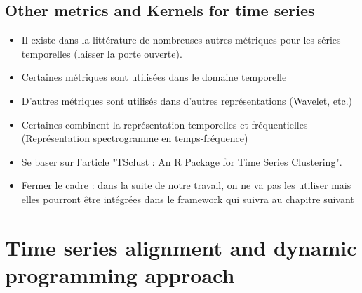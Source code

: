 

\subsection{Other metrics and Kernels for time series}
\begin{itemize}
	\item Il existe dans la littérature de nombreuses autres métriques pour les séries temporelles (laisser la porte ouverte).
	\item Certaines métriques sont utilisées dans le domaine temporelle
	\item D'autres métriques sont utilisés dans d'autres représentations (Wavelet, etc.)
	\item Certaines combinent la représentation temporelles et fréquentielles (Représentation spectrogramme en temps-fréquence)
	\item Se baser sur l'article "TSclust : An R Package for Time Series Clustering".
	\item Fermer le cadre : dans la suite de notre travail, on ne va pas les utiliser mais elles pourront être intégrées dans le framework qui suivra au chapitre suivant
\end{itemize}


\section{Time series alignment and dynamic programming approach}

